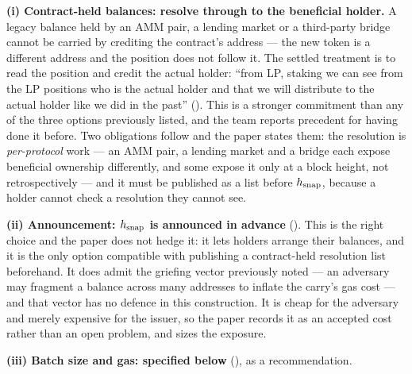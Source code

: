 \begin{remark}
\label{rem:snapshot-settled}
\textbf{(i) Contract-held balances: resolve through to the beneficial holder.} A legacy balance held
by an AMM pair, a lending market or a third-party bridge cannot be carried by crediting the
contract's address --- the new token is a different address and the position does not follow it. The
settled treatment is to read the position and credit the actual holder: ``from LP, staking we can see
from the LP positions who is the actual holder and that we will distribute to the actual holder like
we did in the past''  (\planned). This is a stronger
commitment than any of the three options previously listed, and the team reports precedent for
having done it before. Two obligations follow and the paper states them: the resolution is
\emph{per-protocol} work --- an AMM pair, a lending market and a bridge each expose beneficial
ownership differently, and some expose it only at a block height, not retrospectively --- and it must
be published as a list before $h_{\mathrm{snap}}$, because a holder cannot check a resolution they
cannot see. 

\textbf{(ii) Announcement: $h_{\mathrm{snap}}$ is announced in advance}  (\planned). This is the right choice and the paper does not hedge it: it lets holders
arrange their balances, and it is the only option compatible with publishing a contract-held
resolution list beforehand. It does admit the griefing vector previously noted --- an adversary may
fragment a balance across many addresses to inflate the carry's gas cost --- and that vector has no
defence in this construction. It is cheap for the adversary and merely expensive for the issuer, so
the paper records it as an accepted cost rather than an open problem, and 
sizes the exposure.

\textbf{(iii) Batch size and gas: specified below} (), as a recommendation.
\end{remark}

